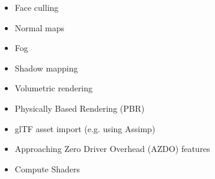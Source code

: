 \documentclass[calcdimensions,landscape,letterpaper]{powersem}
\newcommand{\thecurrentheading}{}
\newcommand{\heading}[1]{\renewcommand{\thecurrentheading}{#1}}
\begin{document}

\begin{slide}
  \heading{Further Topics}
  \begin{center}
    \begin{minipage}[c]{.6\textwidth}
      \begin{itemize}
        \item Face culling
        \item Normal maps
        \item Fog
        \item Shadow mapping
        \item Volumetric rendering
        \item Physically Based Rendering (PBR)
        \item glTF asset import (e.g. using Assimp)
        \item Approaching Zero Driver Overhead (AZDO) features
        \item Compute Shaders
      \end{itemize}
    \end{minipage}
  \end{center}
\end{slide}
\end{document}
